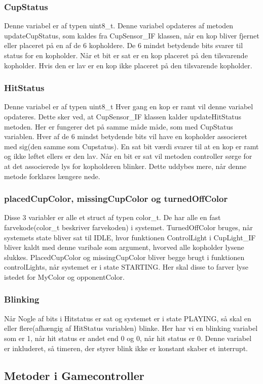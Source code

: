 \documentclass[Softwaredesign/Softwaredesign_main.tex]{subfiles}
\begin{document}
\subsubsection{CupStatus}
Denne variabel er af typen uint8\_t. Denne variabel opdateres af metoden updateCupStatus, som kaldes fra CupSensor\_IF klassen, når en kop bliver fjernet eller placeret på en af de 6 kopholdere. De 6 mindst betydende bits svarer til status for en kopholder. Når et bit er sat er en kop placeret på den tilsvarende kopholder. Hvis den er lav er en kop ikke placeret på den tilsvarende kopholder. 
\subsubsection{HitStatus}
Denne variabel er af typen uint8\_t Hver gang en kop er ramt vil denne variabel opdateres. Dette sker ved, at CupSensor\_IF klassen kalder updateHitStatus metoden. Her er fungerer det på samme måde måde, som med CupStatus variablen. Hver af de 6 mindst betydende bits vil have en kopholder associeret med sig(den samme som Cupstatus). En sat bit værdi svarer til at en kop er ramt og ikke løftet ellers er den lav. Når en bit er sat vil metoden controller sørge for at det associerede lys for kopholderen blinker. Dette uddybes mere, når denne metode forklares længere nede.
\subsubsection{placedCupColor, missingCupColor og turnedOffColor}
Disse 3 variabler er alle et struct af typen color\_t. De har alle en fast farvekode(color\_t beskriver farvekoden) i systemet. TurnedOffColor bruges, når systemets state bliver sat til IDLE, hvor funktionen ControlLight i CupLight\_IF bliver kaldt med denne varibale som argument, hvorved alle kopholder lysene slukkes. PlacedCupColor og missingCupColor bliver begge brugt i funktionen controlLights, når systemet er i state STARTING. Her skal disse to farver lyse istedet for MyColor og opponentColor.
\subsubsection{Blinking}
Når Nogle af bits i Hitstatus er sat og systemet er i state PLAYING, så skal en eller flere(afhængig af HitStatus variablen) blinke. Her har vi en blinking variabel som er 1, når hit status er andet end 0 og 0, når hit status er 0. Denne variabel er inkluderet, så timeren, der styrer blink ikke er konstant skaber et interrupt.
\subsection{Metoder i Gamecontroller}
\end{document}
